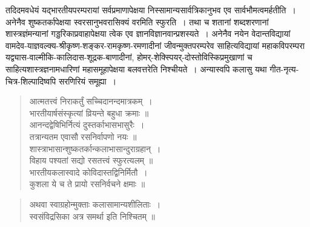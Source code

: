 {\dev तदिदमवधेयं यद्भारतीयपरम्परायां सर्वप्रमाणापेक्षया निस्सामान्यसार्वत्रिकानुभव एव सार्व\-भौमत्वमर्हतीति~। अनेनैव शुष्कतर्कापेक्षया स्वरसानुभवरासिक्यं वरमिति स्फुरति~। तथा च शतानां शब्दशरणानां शास्त्रज्ञंमन्यानां गड्डरिकाप्रवाहापेक्षया त्वेक एव ज्ञानविज्ञानवान्प्रश\-स्यते~। अनेनैव नयेन वेदान्तविद्यायां  वामदेव-याज्ञवल्क्य-श्रीकृष्ण-शङ्कर-रामकृष्ण-रमणा\-दीनां जीवन्मुक्तपरम्परेव साहित्यविद्यायां महाकविपरम्परा यद्व्यास-वाल्मीकि-कालिदास-शूद्रक-बाणादीनां, होमर्-शेक्स्पियर्-दोस्तोविस्किप्रमुखाणां च साहित्यशास्त्रज्ञनामधारिणां महासमूहापेक्षया बलवत्तरेति निश्चीयते~। अन्यास्वपि कलासु यथा गीत-नृत्य-चित्र-शिल्पादिष्वपि सरणिरियं समूह्या~।}
\begin{quote}
{\dev आत्मतत्त्वं निराकर्तुं सच्चिदानन्दमात्रकम्~।}\\
{\dev भारतीयार्षसंस्कृत्यां व्रियन्ते बहुधा क्रमाः ॥}\\[5pt]
{\dev आनन्दद्वेषिभिर्नित्यं दुस्तर्काभासभासुरैः~।}\\
{\dev तत्रान्यतम एवासौ रसनिर्वापणो नयः ॥}\\[5pt]
{\dev शास्त्राभासान्शुष्कतर्कान्कलाभासान्दुराग्रहान्~।}\\
{\dev विहाय पश्यतां सद्यो रसतत्त्वं स्फुरत्यलम् ॥}\\[5pt]
{\dev भारतीयकलास्वादे कोविदास्तद्विनिर्मितौ~।}\\
{\dev कुशला ये च ते प्रायो रसनिर्वचने क्षमाः ॥}
\end{quote}

\newpage

\begin{quote}
{\dev अथवा स्वाग्रहोन्मुक्ताः कलासामान्यशीलिताः~।}\\
{\dev स्वसंविद्रसिका अत्र समर्था इति निश्चितम् ॥}
\end{quote}

